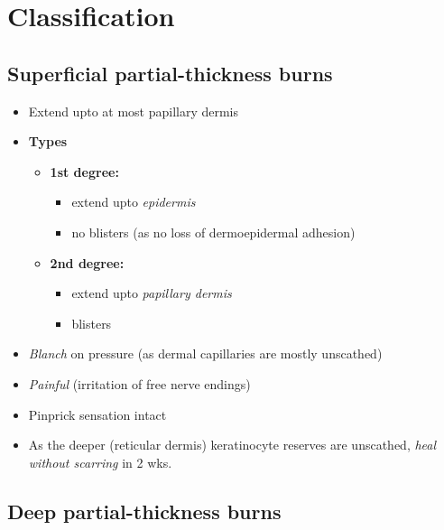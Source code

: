 \documentclass[
  12pt,
]{memoir}
\providecommand{\tightlist}{%
  \setlength{\itemsep}{0pt}\setlength{\parskip}{0pt}}
\begin{document}
\hypertarget{classification-1}{%
\section{Classification}\label{classification-1}}

\hypertarget{superficial-partial-thickness-burns}{%
\subsection{Superficial partial-thickness
burns}\label{superficial-partial-thickness-burns}}

\begin{itemize}
\tightlist
\item
  Extend upto at most papillary dermis
\item
  \textbf{Types}

  \begin{itemize}
  \tightlist
  \item
    \textbf{1st degree:}

    \begin{itemize}
    \tightlist
    \item
      extend upto \emph{epidermis}
    \item
      no blisters (as no loss of dermoepidermal adhesion)
    \end{itemize}
  \item
    \textbf{2nd degree:}

    \begin{itemize}
    \tightlist
    \item
      extend upto \emph{papillary dermis}
    \item
      blisters
    \end{itemize}
  \end{itemize}
\item
  \emph{Blanch} on pressure (as dermal capillaries are mostly unscathed)
\item
  \emph{Painful} (irritation of free nerve endings)
\item
  Pinprick sensation intact
\item
  As the deeper (reticular dermis) keratinocyte reserves are unscathed,
  \emph{heal without scarring} in 2 wks.
\end{itemize}

\hypertarget{deep-partial-thickness-burns}{%
\subsection{Deep partial-thickness
burns}\label{deep-partial-thickness-burns}}
\end{document}

